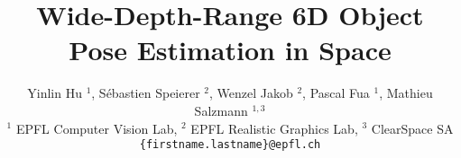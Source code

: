 \documentclass[10pt,twocolumn,letterpaper]{article}
\begin{document}
\title{Wide-Depth-Range 6D Object Pose Estimation in Space}

\author{%
	{Yinlin Hu $^1$, \quad S\'ebastien Speierer $^2$, \quad Wenzel Jakob $^2$, \quad Pascal Fua $^1$, \quad Mathieu Salzmann $^{1,3}$} \\
	{\small $^1$ EPFL Computer Vision Lab, \quad $^2$ EPFL Realistic Graphics Lab, \quad $^3$ ClearSpace SA} \\
	{\tt \small \{firstname.lastname\}@epfl.ch}\\
}

\maketitle








{\small
% 


}
\end{document}
